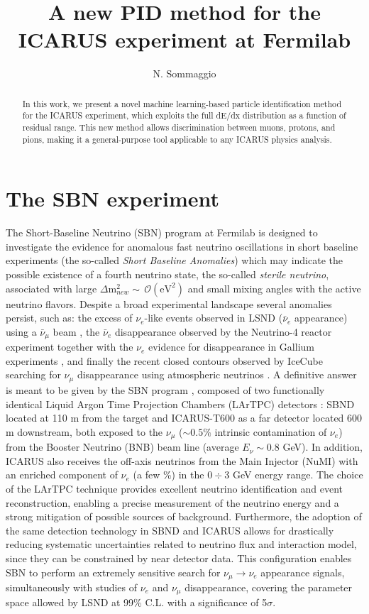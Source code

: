 \documentclass[nocopyright]{cimento}
\title{A new PID method for the ICARUS experiment at Fermilab}
\author{N. Sommaggio}
\begin{document}
\maketitle

\begin{abstract}
In this work, we present a novel machine learning-based particle identification
method for the ICARUS experiment, which exploits the full dE/dx distribution as a function of residual range. This new method allows discrimination between muons, protons, and pions, making it a general-purpose tool applicable to any ICARUS physics analysis.
\end{abstract}

\section{The SBN experiment}

The Short-Baseline Neutrino (SBN) program at Fermilab is designed to investigate the evidence for anomalous fast
neutrino oscillations in short baseline experiments (the so-called \textit{Short Baseline Anomalies}) which may indicate the possible existence of a fourth neutrino state, the so-called \textit{sterile neutrino}, associated with large 
$\Delta\text{m}_{new}^2\sim\,\mathcal{O}(\text{eV}^2)$ and small mixing angles with the active neutrino flavors.
Despite a broad experimental landscape several anomalies persist, such as: the excess of $\nu_e$-like events observed in LSND ($\bar{\nu}_e$ appearance) using a $\bar{\nu}_\mu$ beam \cite{ref:lsnd}, the $\bar{\nu}_e$ disappearance observed by the Neutrino-4 reactor experiment \cite{ref:neutrino4} together with the $\nu_e$ evidence for disappearance in Gallium experiments \cite{ref:neutrino4_combined}\cite{ref:gallium}, and finally the recent closed contours observed by IceCube searching for $\nu_\mu$ disappearance using atmospheric neutrinos \cite{ref:icecube}.
A definitive answer is meant to be given by the SBN program \cite{ref:sbn}, composed of two functionally identical Liquid Argon Time Projection Chambers (LArTPC) detectors \cite{ref:tpc_rubbia}: SBND located at 110 m from the target and ICARUS-T600 as a far detector located 600 m downstream, both exposed to the $\nu_\mu$ ($\sim0.5\%$ intrinsic contamination of $\nu_e$) from the Booster Neutrino (BNB) beam line (average $E_\nu\sim$0.8 GeV). In addition, ICARUS also receives the off-axis neutrinos from the Main Injector (NuMI) with an enriched component of $\nu_e$ (a few \%) in the $0\div3$ GeV energy range.  
The choice of the LArTPC technique provides excellent neutrino identification and event reconstruction, enabling a precise measurement of the neutrino energy and a strong mitigation of possible sources of background. Furthermore, the adoption of the same detection technology in SBND and ICARUS allows for drastically reducing systematic uncertainties related to neutrino flux and interaction model, since they can be constrained by near detector data.
This configuration enables SBN to perform an extremely sensitive search for $\nu_\mu\rightarrow\nu_e$ appearance signals, simultaneously with studies of $\nu_e$ and $\nu_\mu$ disappearance, covering the parameter space allowed by LSND at 99\% C.L. with a significance of 5$\sigma$.
\end{document}

